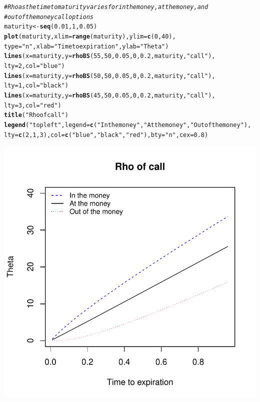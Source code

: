\documentclass{article}\usepackage[]{graphicx}\usepackage[]{color}
\makeatletter
\def\maxwidth{ %
  \ifdim\Gin@nat@width>\linewidth
    \linewidth
  \else
    \Gin@nat@width
  \fi
}
\newcommand{\hlstr}[1]{\textcolor[rgb]{0.192,0.494,0.8}{#1}}%
\newcommand{\hlcom}[1]{\textcolor[rgb]{0.678,0.584,0.686}{\textit{#1}}}%
\newcommand{\hlkwd}[1]{\textcolor[rgb]{0.737,0.353,0.396}{\textbf{#1}}}%
\newenvironment{kframe}{%
 \def\at@end@of@kframe{}%
 \ifinner\ifhmode%
  \def\at@end@of@kframe{\end{minipage}}%
  \begin{minipage}{\columnwidth}%
 \fi\fi%
 \def\FrameCommand##1{\hskip\@totalleftmargin \hskip-\fboxsep
 \colorbox{shadecolor}{##1}\hskip-\fboxsep
     \hskip-\linewidth \hskip-\@totalleftmargin \hskip\columnwidth}%
 \MakeFramed {\advance\hsize-\width
   \@totalleftmargin\z@ \linewidth\hsize
   \@setminipage}}%
 {\par\unskip\endMakeFramed%
 \at@end@of@kframe}
\newenvironment{knitrout}{}{} %
\makeatother
\begin{document}
\begin{knitrout}
\color{fgcolor}\begin{kframe}
\begin{alltt}
\hlcom{# Rho as the time to maturity varies for in the money, at the money, and}
\hlcom{# out of the money call options}
maturity <- \hlkwd{seq}(0.01, 1, 0.05)
\hlkwd{plot}(maturity, xlim = \hlkwd{range}(maturity), ylim = \hlkwd{c}(0,40), 
     type=\hlstr{"n"}, xlab=\hlstr{"Time to expiration"}, ylab=\hlstr{"Theta"})
\hlkwd{lines}(x = maturity, y = \hlkwd{rhoBS}(55, 50, 0.05, 0, 0.2, maturity, \hlstr{"call"}), 
      lty=2, col=\hlstr{"blue"})
\hlkwd{lines}(x = maturity, y = \hlkwd{rhoBS}(50, 50, 0.05, 0, 0.2, maturity, \hlstr{"call"}), 
      lty=1, col=\hlstr{"black"})
\hlkwd{lines}(x = maturity, y = \hlkwd{rhoBS}(45, 50, 0.05, 0, 0.2, maturity, \hlstr{"call"}), 
      lty=3, col=\hlstr{"red"})
\hlkwd{title}(\hlstr{"Rho of call"})
\hlkwd{legend}(\hlstr{"topleft"}, legend=\hlkwd{c}(\hlstr{"In the money"}, \hlstr{"At the money"}, \hlstr{"Out of the money"}),
       lty=\hlkwd{c}(2,1,3), col=\hlkwd{c}(\hlstr{"blue"}, \hlstr{"black"}, \hlstr{"red"}), bty=\hlstr{"n"}, cex=0.8)
\end{alltt}
\end{kframe}
\includegraphics[width=\maxwidth]{figure/unnamed-chunk-23} 

\end{knitrout}
\end{document}
